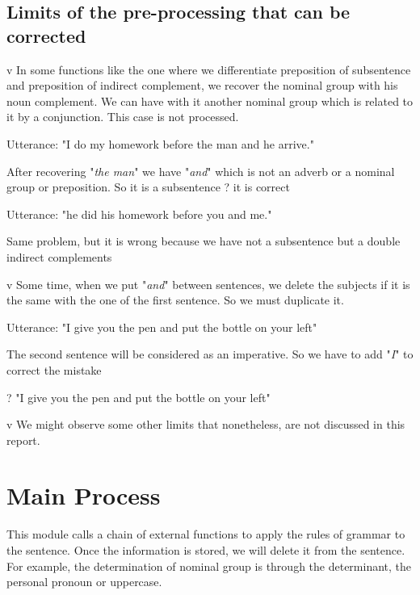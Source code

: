 \documentclass[twoside,a4paper,10pt]{report}
\begin{document}
\subsection{Limits of the pre-processing that can be corrected}
\label{751e28b2f79ada5fd6de3cc8dcb5ed90}%
v  In some functions like the one where we differentiate preposition of subsentence and preposition of indirect complement, we recover the nominal group with his noun complement. We can have with it another nominal group which is related to it by a conjunction. This case is not processed.


\small
\begin{verbatimtab}
  Utterance: "I do my homework before the man and he arrive."
\end{verbatimtab}
\normalsize
After recovering "\textsl{the man}" we have "\textsl{and}" which is not an adverb or a nominal group or preposition. So it is a subsentence ? it is correct


\small
\begin{verbatimtab}
  Utterance: "he did his homework before you and me."
\end{verbatimtab}
\normalsize
Same problem, but it is wrong because we have not a subsentence but a double indirect complements

v  Some time, when we put "\textsl{and}" between sentences, we delete the subjects if it is the same with the one of the first sentence. So we must duplicate it.


\small
\begin{verbatimtab}
  Utterance: "I give you the pen and put the bottle on your left"
\end{verbatimtab}
\normalsize
The second sentence will be considered as an imperative. So we have to add "\textsl{I}" to correct the mistake


\small
\begin{verbatimtab}
  ? "I give you the pen and put the bottle on your left"
\end{verbatimtab}
\normalsize

v  We might observe some other limits that nonetheless, are not discussed in this report.


\section{Main Process}
\label{0e76170b5e24f80d8e04eca241527e68}%
This module calls a chain of external functions to apply the rules of grammar to the sentence.  Once the information is stored, we will delete it from the sentence. For example, the determination of nominal group is through the determinant, the personal pronoun or uppercase.
\end{document}

